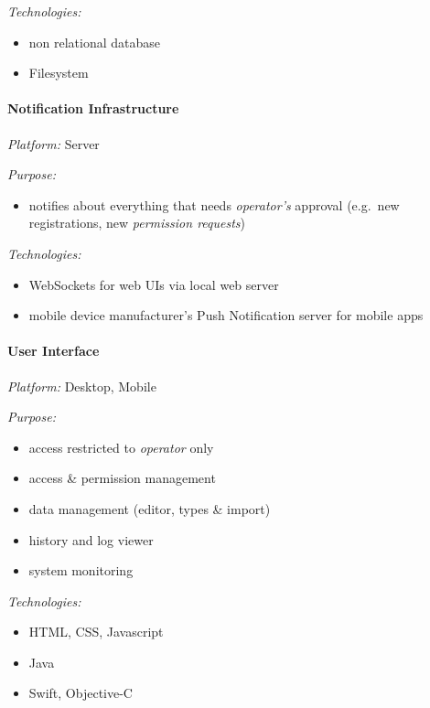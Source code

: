\documentclass[12pt,english,a4paper,titlepage,cleardoublepage=empty,dottedtoc]{report}
\providecommand{\tightlist}{%
  \setlength{\itemsep}{0pt}\setlength{\parskip}{0pt}}
\begin{document}
\emph{Technologies:}

\begin{itemize}
\tightlist
\item
  non relational database
\item
  Filesystem
\end{itemize}

\paragraph{Notification
Infrastructure}\label{notification-infrastructure}

\emph{Platform:} Server

\emph{Purpose:}

\begin{itemize}
\tightlist
\item
  notifies about everything that needs \emph{operator's} approval
  (e.g.~new registrations, new \emph{permission requests})
\end{itemize}

\emph{Technologies:}

\begin{itemize}
\tightlist
\item
  WebSockets for web UIs via local web server
\item
  mobile device manufacturer's Push Notification server for mobile apps
\end{itemize}

\paragraph{User Interface}\label{user-interface}

\emph{Platform:} Desktop, Mobile

\emph{Purpose:}

\begin{itemize}
\tightlist
\item
  access restricted to \emph{operator} only
\item
  access \& permission management
\item
  data management (editor, types \& import)
\item
  history and log viewer
\item
  system monitoring
\end{itemize}

\emph{Technologies:}

\begin{itemize}
\tightlist
\item
  HTML, CSS, Javascript
\item
  Java
\item
  Swift, Objective-C
\end{itemize}
\end{document}
